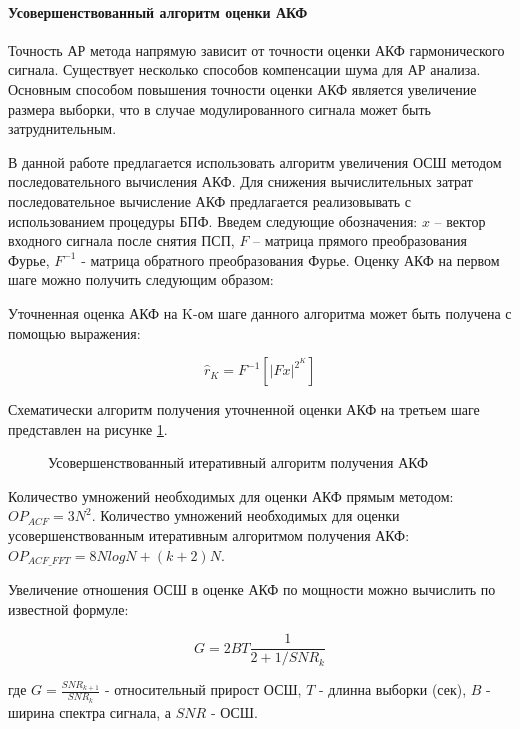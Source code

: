 \paragraph{Усовершенствованный алгоритм оценки АКФ}
Точность АР метода напрямую зависит от точности оценки АКФ гармонического сигнала.
Существует несколько способов компенсации шума для АР анализа.
Основным способом повышения точности оценки АКФ является увеличение размера выборки, что в случае модулированного сигнала может быть затруднительным. 

В данной работе предлагается использовать алгоритм увеличения ОСШ методом последовательного вычисления АКФ.
Для снижения вычислительных затрат последовательное вычисление АКФ предлагается реализовывать с использованием процедуры БПФ. 
Введем следующие обозначения: ${x}$ – вектор входного сигнала после снятия ПСП, ${F}$ – матрица прямого преобразования Фурье,
${F^{-1}}$ - матрица обратного преобразования Фурье. Оценку АКФ на первом шаге можно получить следующим образом:

Уточненная оценка АКФ на K-ом шаге данного алгоритма может быть получена с помощью выражения:
\begin{center}
\begin{equation}
	\label{eq:akf_3}
	\hat{r}_K = F^{-1}\left[ \left| Fx \right| ^{2^K} \right]
\end{equation}
\end{center}

Схематически алгоритм получения уточненной оценки АКФ на третьем шаге представлен на рисунке \ref{pic:akf_pic}.
\begin{figure}[H]
	\center{}
	\caption{Усовершенствованный итеративный алгоритм получения АКФ}
	\label{pic:akf_pic}
\end{figure}

Количество умножений необходимых для оценки АКФ прямым методом: ${OP_{ACF} = 3N^2}$. Количество умножений необходимых для оценки
усовершенствованным итеративным алгоритмом получения АКФ: ${OP_{ACF\_FFT} = 8NlogN + (k+2)N}$.

Увеличение отношения ОСШ в оценке АКФ по мощности можно вычислить по известной формуле:
\begin{center}
\begin{equation}
	\label{eq:akf_max_eq}
	G=2BT \frac{1}{2+1/SNR_k}
\end{equation}
\end{center}
где ${G=\frac{SNR_{k+1}}{SNR_k}}$ - относительный прирост ОСШ, ${T}$ - длинна выборки (сек), ${B}$ -  ширина спектра сигнала, 
а ${SNR}$ - ОСШ.


